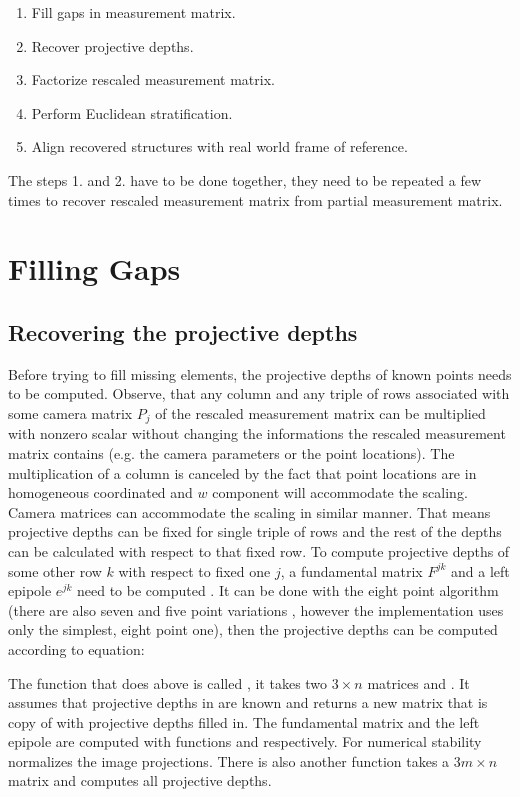 \documentclass[12pt]{article}
\begin{document}
\begin{enumerate}
\item Fill gaps in measurement matrix.
\item Recover projective depths.
\item Factorize rescaled measurement matrix.
\item Perform Euclidean stratification.
\item Align recovered structures with real world frame of reference.
\end{enumerate}

The steps 1. and 2. have to be done together, they need to be repeated a few times to recover rescaled measurement matrix from partial measurement matrix.

\section{Filling Gaps}
\subsection{Recovering the projective depths}
Before trying to fill missing elements, the projective depths of known points needs to be computed. Observe, that any column and any triple of rows associated with some camera matrix $P_j$ of the rescaled measurement matrix can be multiplied with nonzero scalar without changing the informations the rescaled measurement matrix contains (e.g. the camera parameters or the point locations). The multiplication of a column is canceled by the fact that point locations are in homogeneous coordinated and $w$ component will accommodate the scaling. Camera matrices can accommodate the scaling in similar manner. That means projective depths can be fixed for single triple of rows and the rest of the depths can be calculated with respect to that fixed row. To compute projective depths of some other row $k$ with respect to fixed one $j$, a fundamental matrix $F^{jk}$ and a left epipole $e^{jk}$ need to be computed \cite{sturm96}. It can be done with the eight point algorithm \cite{hartley95} (there are also seven and five point variations \cite{stewenius06}, however the implementation uses only the simplest, eight point one), then the projective depths can be computed according to equation:


The function that does above is called , it takes two $3 \times n$ matrices  and . It assumes that projective depths in  are known and returns a new matrix that is copy of  with projective depths filled in. The fundamental matrix and the left epipole are computed with functions  and  respectively. For numerical stability  normalizes the image projections. There is also another function  takes a $3m \times n$ matrix and computes all projective depths.
\end{document}
